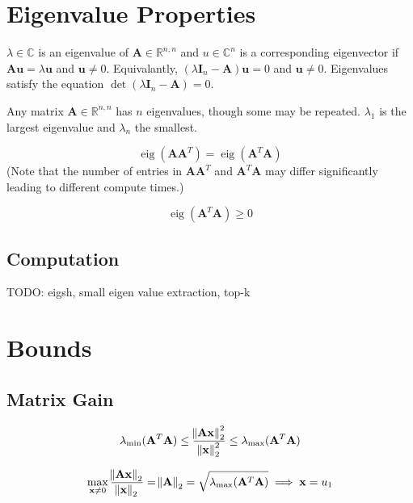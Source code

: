 \documentclass{book}
\newcommand{\mA}{\mathbf{A}}
\newcommand{\mI}{\mathbf{I}}
\newcommand{\vu}{\mathbf{u}}
\newcommand{\vx}{\mathbf{x}}
\DeclareMathOperator{\eig}{eig}
\newcommand{\sRnn}{\mathbb{R}^{n,n}}
\begin{document}
\chapter{Eigenvalue Properties}

$\lambda\in\mathbb{C}$ is an eigenvalue of $\mA\in\sRnn$ and $u\in\mathbb{C}^n$ is a corresponding eigenvector if $\mA\vu=\lambda\vu$ and $\vu\ne0$. Equivalantly, $(\lambda \mI_n-\mA)\vu=0$ and $\vu\ne0$. Eigenvalues satisfy the equation $\det(\lambda\mI_n-\mA)=0$.

Any matrix $\mA\in\sRnn$ has $n$ eigenvalues, though some may be repeated. $\lambda_1$ is the largest eigenvalue and $\lambda_n$ the smallest.

\begin{equation}
\eig(\mA\mA^T)=\eig(\mA^T\mA)
\end{equation}
(Note that the number of entries in $\mA\mA^T$ and $\mA^T\mA$ may differ significantly leading to different compute times.)

\begin{equation}
\eig(\mA^T\mA)\ge0
\end{equation}

\section*{Computation}

TODO: eigsh, small eigen value extraction, top-k











\chapter{Bounds} %

\section{Matrix Gain}
\begin{equation}
\lambda_\textrm{min}(\mA^T\mA)\le \frac{\norm{\mA\vx}_2^2}{\norm{\vx}_2^2}\le\lambda_\textrm{max}(\mA^T\mA)
\end{equation}

\begin{equation}
\max_{\vx\ne0} \frac{\norm{\mA\vx}_2}{\norm{\vx}_2}=\norm{\mA}_2=\sqrt{\lambda_\textrm{max}(\mA^T\mA)}\implies\vx=u_1
\end{equation}
\end{document}
